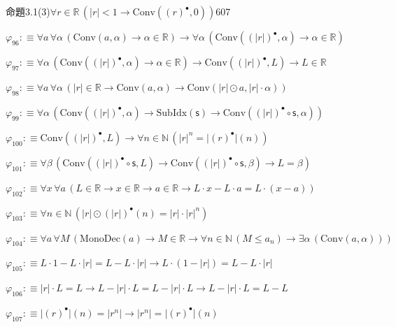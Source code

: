 \begin{fullproof}{命題3.1(3)}{$\forall r \in \mathbb{R}\,(\lvert r \rvert < 1 \to \mathrm{Conv}({(r)^{\bullet}},0))$}{607}
\begin{abbrevlist}
\item $\varphi_{96} :\equiv \forall a\,\forall \alpha\,(\mathrm{Conv}(a,\alpha) \to \alpha \in \mathbb{R}) \to \forall \alpha\,(\mathrm{Conv}({(\lvert r \rvert)^{\bullet}},\alpha) \to \alpha \in \mathbb{R})$
\item $\varphi_{97} :\equiv \forall \alpha\,(\mathrm{Conv}({(\lvert r \rvert)^{\bullet}},\alpha) \to \alpha \in \mathbb{R}) \to \mathrm{Conv}({(\lvert r \rvert)^{\bullet}},L) \to L \in \mathbb{R}$
\item $\varphi_{98} :\equiv \forall a\,\forall \alpha\,(\lvert r \rvert \in \mathbb{R} \to \mathrm{Conv}(a,\alpha) \to \mathrm{Conv}(\lvert r \rvert \odot a,\lvert r \rvert \cdot \alpha))$
\item $\varphi_{99} :\equiv \forall \alpha\,(\mathrm{Conv}({(\lvert r \rvert)^{\bullet}},\alpha) \to \mathrm{SubIdx}(\mathsf{s}) \to \mathrm{Conv}({(\lvert r \rvert)^{\bullet}} \circ \mathsf{s},\alpha))$
\item $\varphi_{100} :\equiv \mathrm{Conv}({(\lvert r \rvert)^{\bullet}},L) \to \forall n \in \mathbb{N}\,({{\lvert r \rvert}^{n}} = \lvert {(r)^{\bullet}} \rvert(n))$
\item $\varphi_{101} :\equiv \forall \beta\,(\mathrm{Conv}({(\lvert r \rvert)^{\bullet}} \circ \mathsf{s},L) \to \mathrm{Conv}({(\lvert r \rvert)^{\bullet}} \circ \mathsf{s},\beta) \to L = \beta)$
\item $\varphi_{102} :\equiv \forall x\,\forall a\,(L \in \mathbb{R} \to x \in \mathbb{R} \to a \in \mathbb{R} \to L \cdot x - L \cdot a = L \cdot (x - a))$
\item $\varphi_{103} :\equiv \forall n \in \mathbb{N}\,(\lvert r \rvert \odot {(\lvert r \rvert)^{\bullet}}(n) = \lvert r \rvert \cdot {{\lvert r \rvert}^{n}})$
\item $\varphi_{104} :\equiv \forall a\,\forall M\,(\mathrm{MonoDec}(a) \to M \in \mathbb{R} \to \forall n \in \mathbb{N}\,(M \leq a_{n}) \to \exists \alpha\,(\mathrm{Conv}(a,\alpha)))$
\item $\varphi_{105} :\equiv L \cdot 1 - L \cdot \lvert r \rvert = L - L \cdot \lvert r \rvert \to L \cdot (1 - \lvert r \rvert) = L - L \cdot \lvert r \rvert$
\item $\varphi_{106} :\equiv \lvert r \rvert \cdot L = L \to L - \lvert r \rvert \cdot L = L - \lvert r \rvert \cdot L \to L - \lvert r \rvert \cdot L = L - L$
\item $\varphi_{107} :\equiv \lvert {(r)^{\bullet}} \rvert(n) = \lvert {{r}^{n}} \rvert \to \lvert {{r}^{n}} \rvert = \lvert {(r)^{\bullet}} \rvert(n)$

\end{abbrevlist}
\end{fullproof}
